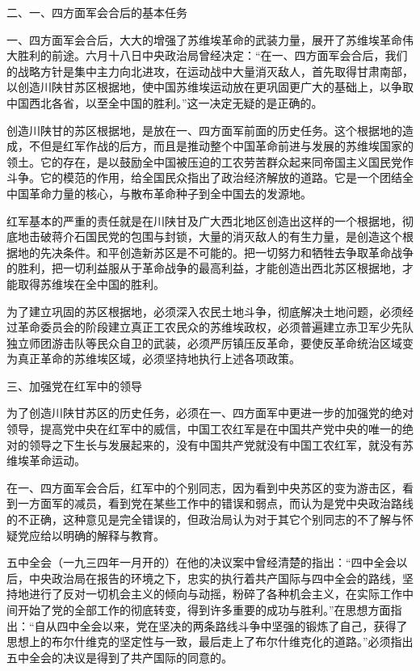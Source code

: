 二、一、四方面军会合后的基本任务

一、四方面军会合后，大大的增强了苏维埃革命的武装力量，展开了苏维埃革命伟大胜利的前途。六月十八日中央政治局曾经决定：“在一、四方面军会合后，我们的战略方针是集中主力向北进攻，在运动战中大量消灭敌人，首先取得甘肃南部，以创造川陕甘苏区根据地，使中国苏维埃运动放在更巩固更广大的基础上，以争取中国西北各省，以至全中国的胜利。”这一决定无疑的是正确的。

创造川陕甘的苏区根据地，是放在一、四方面军前面的历史任务。这个根据地的造成，不但是红军作战的后方，而且是推动整个中国革命前进与发展的苏维埃国家的领土。它的存在，是以鼓励全中国被压迫的工农劳苦群众起来同帝国主义国民党作斗争。它的模范的作用，给全国民众指出了政治经济解放的道路。它是一个团结全中国革命力量的核心，与散布革命种子到全中国去的发源地。

红军基本的严重的责任就是在川陕甘及广大西北地区创造出这样的一个根据地，彻底地击破蒋介石国民党的包围与封锁，大量的消灭敌人的有生力量，是创造这个根据地的先决条件。和平创造新苏区是不可能的。把一切努力和牺牲去争取革命战争的胜利，把一切利益服从于革命战争的最高利益，才能创造出西北苏区根据地，才能取得苏维埃在全中国的胜利。

为了建立巩固的苏区根据地，必须深入农民土地斗争，彻底解决土地问题，必须经过革命委员会的阶段建立真正工农民众的苏维埃政权，必须普遍建立赤卫军少先队独立师团游击队等民众自卫的武装，必须严厉镇压反革命，要使反革命统治区域变为真正革命的苏维埃区域，必须坚持地执行上述各项政策。

三、加强党在红军中的领导

为了创造川陕甘苏区的历史任务，必须在一、四方面军中更进一步的加强党的绝对领导，提高党中央在红军中的威信，中国工农红军是在中国共产党中央的唯一的绝对的领导之下生长与发展起来的，没有中国共产党就没有中国工农红军，就没有苏维埃革命运动。

在一、四方面军会合后，红军中的个别同志，因为看到中央苏区的变为游击区，看到一方面军的减员，看到党在某些工作中的错误和弱点，而认为是党中央政治路线的不正确，这种意见是完全错误的，但政治局认为对于其它个别同志的不了解与怀疑党应给以明确的解释与教育。

五中全会（一九三四年一月开的）在他的决议案中曾经清楚的指出：“四中全会以后，中央政治局在报告的环境之下，忠实的执行着共产国际与四中全会的路线，坚持地进行了反对一切机会主义的倾向与动摇，粉碎了各种机会主义，在实际工作中间开始了党的全部工作的彻底转变，得到许多重要的成功与胜利。”在思想方面指出：“自从四中全会以来，党在坚决的两条路线斗争中坚强的锻炼了自己，获得了思想上的布尔什维克的坚定性与一致，最后走上了布尔什维克化的道路。”必须指出五中全会的决议是得到了共产国际的同意的。

